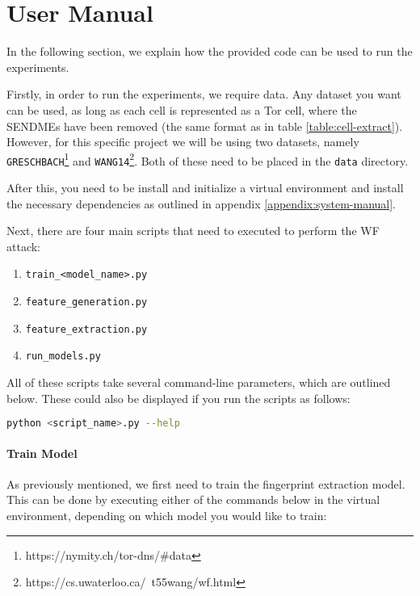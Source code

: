\chapter{User Manual}

\begingroup

\renewcommand{\thesubsection}{\arabic{subsection}}

\renewcommand{\addcontentsline}[3]{}%

In the following section, we explain how the provided code can be used to run the experiments.

Firstly, in order to run the experiments, we require data.
Any dataset you want can be used, as long as each cell is represented as a Tor cell, where the SENDMEs have been removed (the same format as in table \ref{table:cell-extract}).
However, for this specific project we will be using two datasets, namely \texttt{GRESCHBACH}\footnote{https://nymity.ch/tor-dns/\#data} and \texttt{WANG14}\footnote{https://cs.uwaterloo.ca/~t55wang/wf.html}.
Both of these need to be placed in the \texttt{data} directory.

After this, you need to be install and initialize a virtual environment and install the necessary dependencies as outlined in appendix \ref{appendix:system-manual}.

Next, there are four main scripts that need to executed to perform the WF attack:
\begin{enumerate}
  \item \texttt{train\_<model\_name>.py}
  \item \texttt{feature\_generation.py}
  \item \texttt{feature\_extraction.py}
  \item \texttt{run\_models.py}
\end{enumerate}

All of these scripts take several command-line parameters, which are outlined below.
These could also be displayed if you run the scripts as follows:
\begin{lstlisting}[language=Bash]
python <script_name>.py --help
\end{lstlisting}

\subsubsection{Train Model}

As previously mentioned, we first need to train the fingerprint extraction model.
This can be done by executing either of the commands below in the virtual environment, depending on which model you would like to train:

